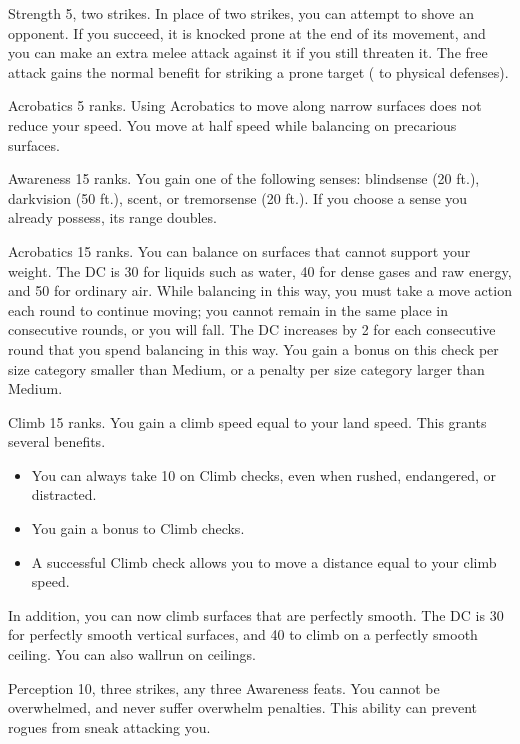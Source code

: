 \featpre Strength 5, two strikes.
\featben In place of two strikes, you can attempt to shove an opponent.
If you succeed, it is knocked prone at the end of its movement, and you can make an extra melee attack against it if you still threaten it.
The free attack gains the normal benefit for striking a prone target ( to physical defenses).

\featpre Acrobatics 5 ranks.
\featben Using Acrobatics to move along narrow surfaces does not reduce your speed.
You move at half speed while balancing on precarious surfaces.

\featpre Awareness 15 ranks.
\featben You gain one of the following senses: blindsense (20 ft.), darkvision (50 ft.), scent, or tremorsense (20 ft.).
If you choose a sense you already possess, its range doubles.

\featpre Acrobatics 15 ranks.
\featben You can balance on surfaces that cannot support your weight.
The DC is 30 for liquids such as water, 40 for dense gases and raw energy, and 50 for ordinary air.
While balancing in this way, you must take a move action each round to continue moving; you cannot remain in the same place in consecutive rounds, or you will fall.
The DC increases by 2 for each consecutive round that you spend balancing in this way.
You gain a  bonus on this check per size category smaller than Medium, or a  penalty per size category larger than Medium.

\featpre Climb 15 ranks.
\featben You gain a climb speed equal to your land speed.
This grants several benefits.
\begin{itemize}
    \item You can always take 10 on Climb checks, even when rushed, endangered, or distracted.
    \item You gain a  bonus to Climb checks.
    \item A successful Climb check allows you to move a distance equal to your climb speed.
\end{itemize}

In addition, you can now climb surfaces that are perfectly smooth.
The DC is 30 for perfectly smooth vertical surfaces, and 40 to climb on a perfectly smooth ceiling.
You can also wallrun on ceilings.

\featpres Perception 10, three strikes, any three Awareness feats.
\featben You cannot be overwhelmed, and never suffer overwhelm penalties.
This ability can prevent rogues from sneak attacking you.


